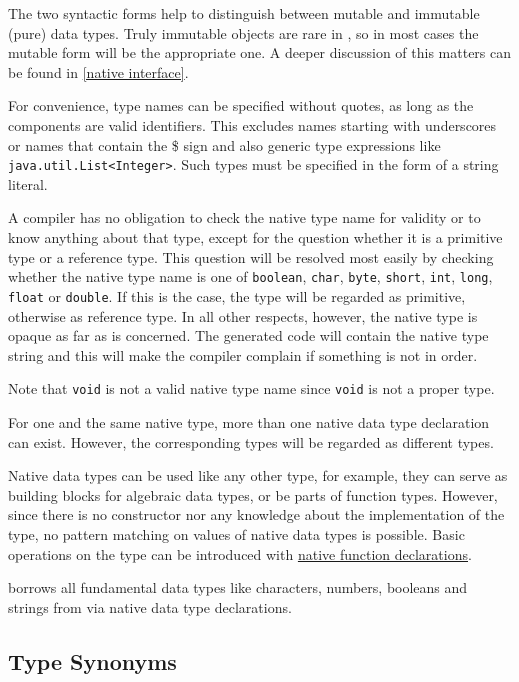 The two syntactic forms help to distinguish between mutable and immutable (pure) data types. Truly immutable objects are rare in \java{}, so in most cases the mutable form will be the appropriate one. A deeper discussion of this matters can be found in \autoref{native interface}.

For convenience, \java{} type names can be specified without quotes, as long as the components are valid \frege{} identifiers. This excludes names starting with underscores or names that contain the \$ sign and also \java{} generic type expressions like \texttt{java.util.List<Integer>}. Such \java{} types must be specified in the form of a string literal.

A \frege{} compiler has no obligation to check the native type name for validity or to know anything about that type, except for the question whether it is a primitive type or a reference type.
This question will be resolved most easily by checking whether the native type name is one of \texttt{boolean}, \texttt{char}, \texttt{byte}, \texttt{short}, \texttt{int}, \texttt{long}, \texttt{float} or \texttt{double}.
If this is the case, the type will be regarded as primitive, otherwise as reference type.
In all other respects, however, the native type is opaque as far as \frege{} is concerned.
The generated code will contain the native type string and this will make the \java{} compiler complain if something is not in order.

Note that \texttt{void} is not a valid native type name since \texttt{void} is not a proper type.

For one and the same native type, more than one native data type declaration can exist. However, the corresponding \frege{} types will be regarded as different types.

Native data types can be used like any other type, for example, they can serve as building blocks for algebraic data types, or be parts of function types. However, since there is no constructor nor any knowledge about the implementation of the type, no pattern matching on values of native data types is possible. Basic operations on the type can be introduced with \hyperref[nativefun]{native function declarations}.

\frege{} borrows all fundamental data types like characters, numbers, booleans and strings from \java{} via native data type declarations. 


\subsection{Type Synonyms} \label{typedcl} 

